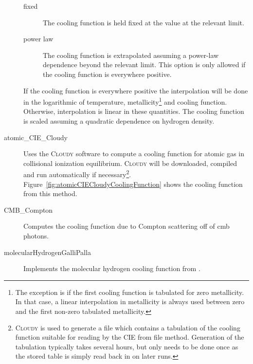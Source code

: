\begin{description}
\begin{description}
  \item[{\normalfont \ttfamily fixed}] The cooling function is held fixed at the value at the relevant limit.
  \item[{\normalfont \ttfamily power law}] The cooling function is extrapolated assuming a power-law dependence beyond the relevant limit. This option is only allowed if the cooling function is everywhere positive.
 \end{description}
 If the cooling function is everywhere positive the interpolation will be done in the logarithmic of temperature, metallicity\footnote{The exception is if the first cooling function is tabulated for zero metallicity. In that case, a linear interpolation in metallicity is always used between zero and the first non-zero tabulated metallicity.} and cooling function. Otherwise, interpolation is linear in these quantities. The cooling function is scaled assuming a quadratic dependence on hydrogen density.
 \item [{\normalfont \ttfamily atomic\_CIE\_Cloudy}] Uses the {\normalfont \scshape Cloudy} software to compute a cooling function for atomic gas in collisional ionization equilibrium. {\normalfont \scshape Cloudy} will be downloaded, compiled and run automatically if necessary\footnote{{\normalfont \scshape Cloudy} is used to generate a file which contains a tabulation of the cooling function suitable for reading by the {\normalfont \ttfamily CIE from file} method. Generation of the tabulation typically takes several hours, but only needs to be done once as the stored table is simply read back in on later runs.}. Figure~\ref{fig:atomicCIECloudyCoolingFunction} shows the cooling function from this method.
 \item [{\normalfont \ttfamily CMB\_Compton}] Computes the cooling function due to Compton scattering off of \gls{cmb} photons.
 \item [{\normalfont \ttfamily molecularHydrogenGalliPalla}] Implements the molecular hydrogen cooling function from \cite{galli_chemistry_1998}.
\end{description}

